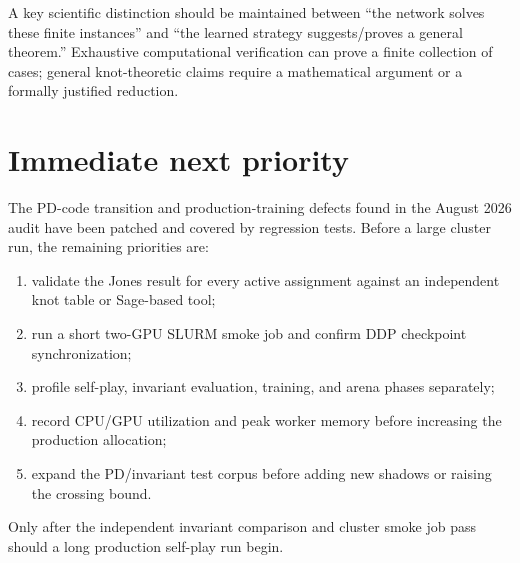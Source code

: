 \documentclass[11pt]{article}
\begin{document}
A key scientific distinction should be maintained between ``the network solves these finite instances'' and ``the learned strategy suggests/proves a general theorem.'' Exhaustive computational verification can prove a finite collection of cases; general knot-theoretic claims require a mathematical argument or a formally justified reduction.

\section{Immediate next priority}

The PD-code transition and production-training defects found in the August 2026 audit have been patched and covered by regression tests. Before a large cluster run, the remaining priorities are:

\begin{enumerate}[label=\arabic*.]
    \item validate the Jones result for every active assignment against an independent knot table or Sage-based tool;
    \item run a short two-GPU SLURM smoke job and confirm DDP checkpoint synchronization;
    \item profile self-play, invariant evaluation, training, and arena phases separately;
    \item record CPU/GPU utilization and peak worker memory before increasing the production allocation;
    \item expand the PD/invariant test corpus before adding new shadows or raising the crossing bound.
\end{enumerate}

Only after the independent invariant comparison and cluster smoke job pass should a long production self-play run begin.
\end{document}

